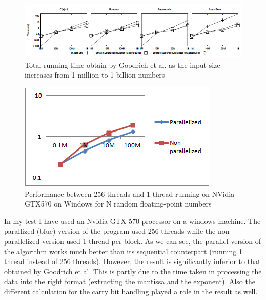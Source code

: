 \documentclass[11pt]{article}       %
\begin{document}
\begin{figure}[h]
\centering
\includegraphics[width=\linewidth]{goodrich_performance}
{\footnotesize \par}
\caption{Total running time obtain by Goodrich et al. \cite{PASFPN} as the input size increases from 1 million to 1 billion numbers}
\end{figure}

\begin{figure}[h]
\centering
\begin{minipage}{0.60\textwidth} %
\includegraphics[width=\linewidth]{performance}
{\footnotesize \par}
\end{minipage}
\caption{Performance between 256 threads and 1 thread running on NVidia GTX570 on Windows for N random floating-point numbers}
\end{figure}


In my test I have used an Nvidia GTX 570 processor on a windows machine. The parallized (blue) version of the program used 256 threads while the non-parallelized version used 1 thread per block. As we can see, the parallel version of the algorithm works much better than its sequential counterpart (running 1 thread instead of 256 threads). However, the result is significantly inferior to that obtained by Goodrich et al. This is partly due to the time taken in processing the data into the right format (extracting the mantissa and the exponent). Also the different calculation for the carry bit handling played a role in the result as well.
\end{document}
